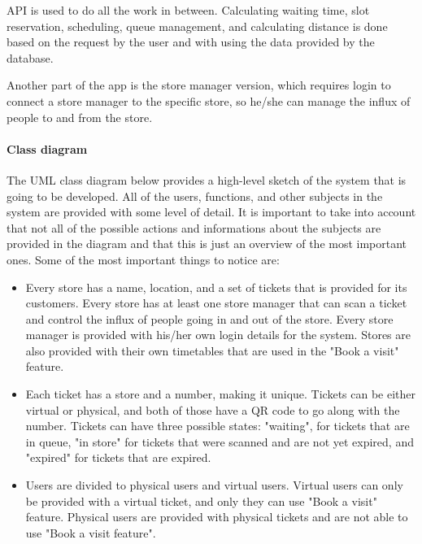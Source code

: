 API is used to do all the work in between. Calculating waiting time, slot reservation, scheduling, queue management, and calculating distance is done based on the request by the user and with using the data provided by the database. 

Another part of the app is the store manager version, which requires login to connect a store manager to the specific store, so he/she can manage the influx of people to and from the store.

\newpage
\paragraph{Class diagram}\hfill \break

The UML class diagram below provides a high-level sketch of the system that is going to be developed. All of the users, functions, and other subjects in the system are provided with some level of detail. It is important to take into account that not all of the possible actions and informations about the subjects are provided in the diagram and that this is just an overview of the most important ones.
Some of the most important things to notice are:
\begin{itemize}
\item Every store has a name, location, and a set of tickets that is provided for its customers. Every store has at least one store manager that can scan a ticket and control the influx of people going in and out of the store. Every store manager is provided with his/her own login details for the system. Stores are also provided with their own timetables that are used in the "Book a visit" feature.
\item Each ticket has a store and a number, making it unique. Tickets can be either virtual or physical, and both of those have a QR code to go along with the number. Tickets can have three possible states: "waiting", for tickets that are in queue, "in store" for tickets that were scanned and are not yet expired, and "expired" for tickets that are expired. 
\item Users are divided to physical users and virtual users. Virtual users can only be provided with a virtual ticket, and only they can use "Book a visit" feature. Physical users are provided with physical tickets and are not able to use "Book a visit feature".
\end{itemize}


